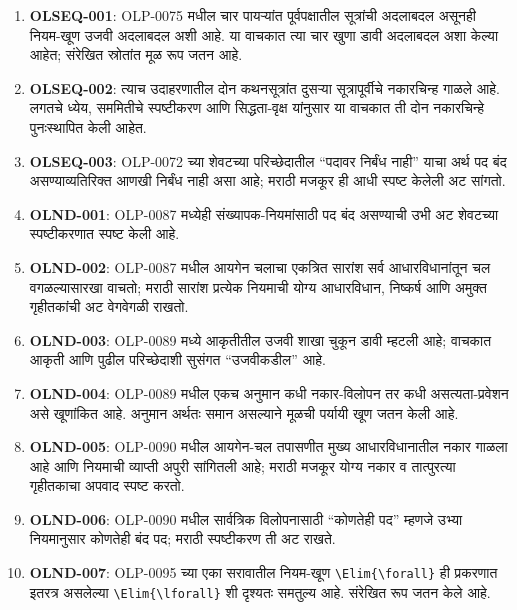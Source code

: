 \begin{enumerate}
\item \textbf{OLSEQ-001}: OLP-0075 मधील चार पायऱ्यांत पूर्वपक्षातील
सूत्रांची अदलाबदल असूनही नियम-खूण उजवी अदलाबदल अशी आहे. या वाचकात त्या
चार खुणा डावी अदलाबदल अशा केल्या आहेत; संरेखित स्रोतांत मूळ रूप जतन आहे.
\item \textbf{OLSEQ-002}: त्याच उदाहरणातील दोन कथनसूत्रांत दुसऱ्या
सूत्रापूर्वीचे नकारचिन्ह गाळले आहे. लगतचे ध्येय, सममितीचे स्पष्टीकरण आणि
सिद्धता-वृक्ष यांनुसार या वाचकात ती दोन नकारचिन्हे पुनःस्थापित केली आहेत.
\item \textbf{OLSEQ-003}: OLP-0072 च्या शेवटच्या परिच्छेदातील ``पदावर
निर्बंध नाही'' याचा अर्थ पद बंद असण्याव्यतिरिक्त आणखी निर्बंध नाही असा आहे;
मराठी मजकूर ही आधी स्पष्ट केलेली अट सांगतो.
\item \textbf{OLND-001}: OLP-0087 मध्येही संख्यापक-नियमांसाठी पद बंद
असण्याची उभी अट शेवटच्या स्पष्टीकरणात स्पष्ट केली आहे.
\item \textbf{OLND-002}: OLP-0087 मधील आयगेन चलाचा एकत्रित सारांश सर्व
आधारविधानांतून चल वगळल्यासारखा वाचतो; मराठी सारांश प्रत्येक नियमाची योग्य
आधारविधान, निष्कर्ष आणि अमुक्त गृहीतकांची अट वेगवेगळी राखतो.
\item \textbf{OLND-003}: OLP-0089 मध्ये आकृतीतील उजवी शाखा चुकून डावी
म्हटली आहे; वाचकात आकृती आणि पुढील परिच्छेदाशी सुसंगत ``उजवीकडील'' आहे.
\item \textbf{OLND-004}: OLP-0089 मधील एकच अनुमान कधी नकार-विलोपन तर
कधी असत्यता-प्रवेशन असे खूणांकित आहे. अनुमान अर्थतः समान असल्याने मूळची
पर्यायी खूण जतन केली आहे.
\item \textbf{OLND-005}: OLP-0090 मधील आयगेन-चल तपासणीत मुख्य
आधारविधानातील नकार गाळला आहे आणि नियमाची व्याप्ती अपुरी सांगितली आहे;
मराठी मजकूर योग्य नकार व तात्पुरत्या गृहीतकाचा अपवाद स्पष्ट करतो.
\item \textbf{OLND-006}: OLP-0090 मधील सार्वत्रिक विलोपनासाठी ``कोणतेही
पद'' म्हणजे उभ्या नियमानुसार कोणतेही बंद पद; मराठी स्पष्टीकरण ती अट राखते.
\item \textbf{OLND-007}: OLP-0095 च्या एका सरावातील नियम-खूण
\verb|\Elim{\forall}| ही प्रकरणात इतरत्र असलेल्या
\verb|\Elim{\lforall}| शी दृश्यतः समतुल्य आहे. संरेखित रूप जतन केले आहे.


\end{enumerate}
